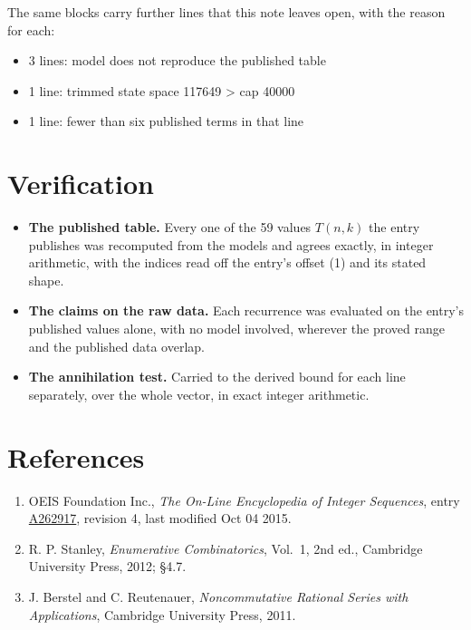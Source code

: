 \documentclass[11pt]{article}
\theoremstyle{definition}
\begin{document}
The same blocks carry further lines that this note leaves open, with the reason for each:

\begin{itemize}

\item 3 lines: model does not reproduce the published table

\item 1 line: trimmed state space 117649 > cap 40000

\item 1 line: fewer than six published terms in that line

\end{itemize}

\section{Verification}

\begin{itemize}

\item {\bfseries The published table.} Every one of the 59 values $T(n,k)$ the entry publishes was recomputed from the models and agrees exactly, in integer arithmetic, with the indices read off the entry's offset (1) and its stated shape.

\item {\bfseries The claims on the raw data.} Each recurrence was evaluated on the entry's published values alone, with no model involved, wherever the proved range and the published data overlap.

\item {\bfseries The annihilation test.} Carried to the derived bound for each line separately, over the whole vector, in exact integer arithmetic.

\end{itemize}

\section{References}

\begin{enumerate}

\item OEIS Foundation Inc., \emph{The On-Line Encyclopedia of Integer Sequences}, entry \href{https://oeis.org/A262917}{A262917}, revision 4, last modified Oct 04 2015.

\item R. P. Stanley, \emph{Enumerative Combinatorics}, Vol.~1, 2nd ed., Cambridge University Press, 2012; \S4.7.

\item J. Berstel and C. Reutenauer, \emph{Noncommutative Rational Series with Applications}, Cambridge University Press, 2011.

\end{enumerate}
\end{document}
